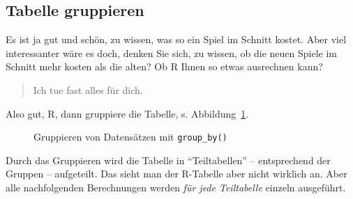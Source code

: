 \documentclass[
  a4paper,
  DIV=11]{scrreprt}
\theoremstyle{definition}
\theoremstyle{definition}
\theoremstyle{definition}
\theoremstyle{remark}
\begin{document}
\subsection{Tabelle gruppieren}\label{tabelle-gruppieren}

Es ist ja gut und schön, zu wissen, was so ein Spiel im Schnitt kostet.
Aber viel interessanter wäre es doch, denken Sie sich, zu wissen, ob die
neuen Spiele im Schnitt mehr kosten als die alten? Ob R Ihnen so etwas
ausrechnen kann?

\begin{quote}
{} Ich tue fast alles für dich. {}
\end{quote}

Also gut, R, dann gruppiere die Tabelle, s. Abbildung~\ref{fig-group}.

\begin{figure}


\caption{\label{fig-group}Gruppieren von Datensätzen mit
\texttt{group\_by()}}

\end{figure}%

Durch das Gruppieren wird die Tabelle in ``Teiltabellen'' --
entsprechend der Gruppen -- aufgeteilt. Das sieht man der R-Tabelle aber
nicht wirklich an. Aber alle nachfolgenden Berechnungen werden \emph{für
jede Teiltabelle} einzeln ausgeführt.
\end{document}
